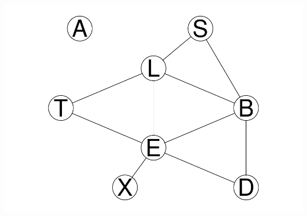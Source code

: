 \documentclass[]{article}
\begin{document}
\includegraphics{Lab1_graphical_models_alive213_files/figure-latex/unnamed-chunk-4-1.pdf}
\end{document}
